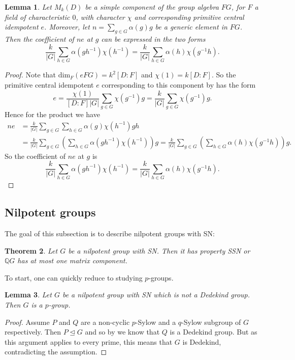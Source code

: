 \documentclass[a4paper,10pt]{amsart}
\newtheorem{lemma}{Lemma}[section]
\newtheorem{theorem}[lemma]{Theorem}
\theoremstyle{definition}
\theoremstyle{remark}
\newcommand{\Q}{{\mathbb Q}}
\begin{document}
\begin{lemma}\label{lem:CoefficientOfProjectionByCharacter}
Let $M_k(D)$ be a simple component of the group algebra $FG$, for $F$ a field of characteristic $0$, with character $\chi$ and corresponding primitive central idempotent $e$. Moreover, let $n = \sum_{g \in G}\alpha(g)g$ be a generic element in $FG$. Then the coefficient of $ne$ at $g$ can be expressed in the two forms
\[\frac{k}{|G|} \sum_{h \in G} \alpha(gh^{-1}) \chi(h^{-1}) = \frac{k}{|G|} \sum_{h \in G} \alpha(h) \chi(g^{-1}h). \]
\end{lemma}
\begin{proof}
Note that $\text{dim}_F(eFG) = k^2[D:F]$ and $\chi(1) = k[D:F]$. So the primitive central idempotent $e$ corresponding to this component by  has the form
\[e = \frac{\chi(1)}{[D:F]|G|}\sum_{g \in G} \chi(g^{-1})g = \frac{k}{|G|}\sum_{g \in G} \chi(g^{-1})g. \]
Hence for the product we have
\begin{align*}
ne &= \frac{k}{|G|}\sum_{g \in G} \sum_{h \in G} \alpha(g) \chi(h^{-1})gh \\
&= \frac{k}{|G|}\sum_{g \in G} \left(\sum_{h \in G} \alpha(gh^{-1}) \chi(h^{-1})\right)g = \frac{k}{|G|}\sum_{g \in G} \left(\sum_{h \in G} \alpha(h) \chi(g^{-1}h)\right)g.
\end{align*}
So the coefficient of $ne$ at $g$ is
\[\frac{k}{|G|} \sum_{h \in G} \alpha(gh^{-1}) \chi(h^{-1}) = \frac{k}{|G|} \sum_{h \in G} \alpha(h) \chi(g^{-1}h). \]
\end{proof}

\subsection{Nilpotent groups}

The goal of this subsection is to describe nilpotent groups with SN:

\begin{theorem}\label{prop:NilpotentSNNotSSN}
Let $G$ be a nilpotent group with SN. Then it has property SSN or $\Q G$ has at most one matrix component.
\end{theorem}

To start, one can quickly reduce to studying $p$-groups.

\begin{lemma}\label{lem:FromNilpotentToPGroup}
Let $G$ be a nilpotent group with SN which is not a Dedekind group. Then $G$ is a $p$-group.
\end{lemma}
\begin{proof}
Assume $P$ and $Q$ are a non-cyclic $p$-Sylow and a $q$-Sylow subgroup of $G$ respectively. Then $P \unlhd G$ and so by  we know that $Q$ is a Dedekind group. But as this argument applies to every prime, this means that $G$ is Dedekind, contradicting the assumption.
\end{proof}
\end{document}
